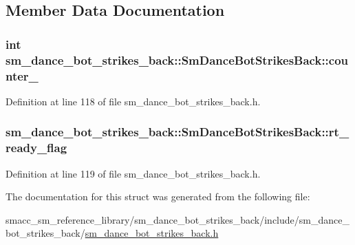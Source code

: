 \subsection{Member Data Documentation}
\subsubsection[{\texorpdfstring{counter\+\_\+1}{counter_1}}]{\setlength{\rightskip}{0pt plus 5cm}int sm\+\_\+dance\+\_\+bot\+\_\+strikes\+\_\+back\+::\+Sm\+Dance\+Bot\+Strikes\+Back\+::counter\+\_}\hypertarget{structsm__dance__bot__strikes__back_1_1SmDanceBotStrikesBack_a0cf56e316022dde4b3da552ab9f68513}{}\label{structsm__dance__bot__strikes__back_1_1SmDanceBotStrikesBack_a0cf56e316022dde4b3da552ab9f68513}


Definition at line 118 of file sm\+\_\+dance\+\_\+bot\+\_\+strikes\+\_\+back.\+h.

\subsubsection[{\texorpdfstring{rt\+\_\+ready\+\_\+flag}{rt_ready_flag}}]{ sm\+\_\+dance\+\_\+bot\+\_\+strikes\+\_\+back\+::\+Sm\+Dance\+Bot\+Strikes\+Back\+::rt\+\_\+ready\+\_\+flag}\hypertarget{structsm__dance__bot__strikes__back_1_1SmDanceBotStrikesBack_a609265a94c2575580fbb014f551a066a}{}\label{structsm__dance__bot__strikes__back_1_1SmDanceBotStrikesBack_a609265a94c2575580fbb014f551a066a}


Definition at line 119 of file sm\+\_\+dance\+\_\+bot\+\_\+strikes\+\_\+back.\+h.



The documentation for this struct was generated from the following file\+:\begin{DoxyCompactItemize}
\item 
smacc\+\_\+sm\+\_\+reference\+\_\+library/sm\+\_\+dance\+\_\+bot\+\_\+strikes\+\_\+back/include/sm\+\_\+dance\+\_\+bot\+\_\+strikes\+\_\+back/\hyperlink{sm__dance__bot__strikes__back_8h}{sm\+\_\+dance\+\_\+bot\+\_\+strikes\+\_\+back.\+h}\end{DoxyCompactItemize}
